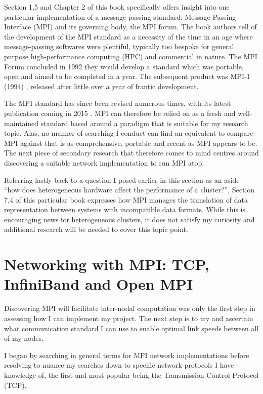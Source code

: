 Section 1,5 and Chapter 2 of this book specifically offers insight into one particular implementation of a message-passing standard: Message-Passing Interface (MPI) and its governing body, the MPI forum. The book authors tell of the development of the MPI standard as a necessity of the time in an age where message-passing softwares were plentiful, typically too bespoke for general purpose high-performance computing (HPC) and commercial in nature. The MPI Forum concluded in 1992 they would develop a standard which was portable, open and aimed to be completed in a year. The subsequent product was MPI-1 (1994) \cite{mpi_1994}, released after little over a year of frantic development.

The MPI standard has since been revised numerous times, with its latest publication coming in 2015 \cite{mpi_2015}. MPI can therefore be relied on as a fresh and well-maintained standard based around a paradigm that is suitable for my research topic. Alas, no manner of searching I conduct can find an equivalent to compare MPI against that is as comprehensive, portable and recent as MPI appears to be. The next piece of secondary research that therefore comes to mind centres around discovering a suitable network implementation to run MPI atop.

Referring lastly back to a question I posed earlier in this section as an aside -- ``how does heterogeneous hardware affect the performance of a cluster?'', Section 7,4 of this particular book expresses how MPI manages the translation of data representation between systems with incompatible data formats. While this is encouraging news for heterogeneous clusters, it does not satisfy my curiosity and additional research will be needed to cover this topic point.

\section{Networking with MPI: TCP, InfiniBand and Open MPI}
Discovering MPI will facilitate inter-nodal computation was only the first step in assessing how I can implement my project. The next step is to try and ascertain what communication standard I can use to enable optimal link speeds between all of my nodes.

I began by searching in general terms for MPI network implementations before resolving to nuance my searches down to specific network protocols I have knowledge of, the first and most popular being the Transmission Control Protocol (TCP).

